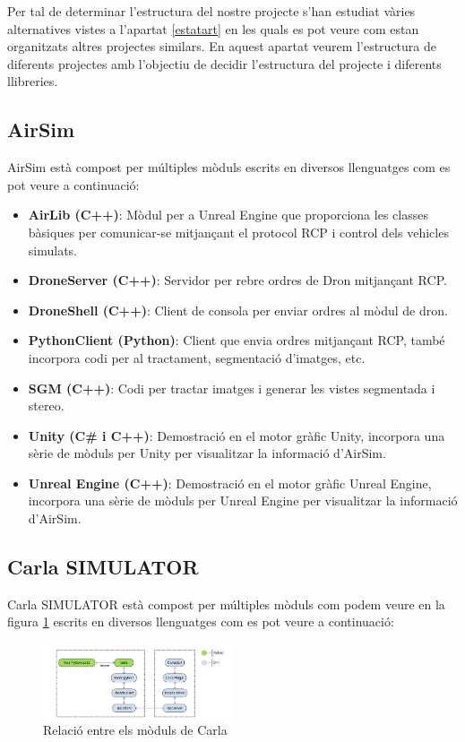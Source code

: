 \documentclass[10pt,a4paper,twocolumn,twoside]{article}
\begin{document}
Per tal de determinar l'estructura del nostre projecte s'han estudiat vàries alternatives vistes a l'apartat \ref{estatart} en les quals es pot veure com estan organitzats altres projectes similars. En aquest apartat veurem l'estructura de diferents projectes amb l'objectiu de decidir l'estructura del projecte i diferents llibreries.

\subsection{AirSim} 

AirSim està compost per múltiples mòduls escrits en diversos llenguatges com es pot veure a continuació:

\begin{itemize}
  \item \textbf{AirLib (C++)}: Mòdul per a Unreal Engine que proporciona les classes bàsiques per comunicar-se mitjançant el protocol RCP i control dels vehicles simulats.
  \item \textbf{DroneServer (C++)}: Servidor per rebre ordres de Dron mitjançant RCP.
  \item \textbf{DroneShell (C++)}: Client de consola per enviar ordres al mòdul de dron.
  \item \textbf{PythonClient (Python)}: Client que envia ordres mitjançant RCP, també incorpora codi per al tractament, segmentació d'imatges, etc.
  \item \textbf{SGM (C++)}: Codi per tractar imatges i generar les vistes segmentada i stereo.
  \item \textbf{Unity (C\# i C++)}: Demostració en el motor gràfic Unity, incorpora una sèrie de mòduls per Unity per visualitzar la informació d'AirSim.
  \item \textbf{Unreal Engine (C++)}: Demostració en el motor gràfic Unreal Engine, incorpora una sèrie de mòduls per Unreal Engine per visualitzar la informació d'AirSim.
\end{itemize}

\subsection{Carla SIMULATOR}

Carla SIMULATOR està compost per múltiples mòduls com podem veure en la figura \ref{fig-carlamodules} escrits en diversos llenguatges com es pot veure a continuació:

\begin{figure}[!h]
\centering
  	\includegraphics[width=0.5\textwidth]{carlamodules}
	\caption{Relació entre els mòduls de Carla}
	\label{fig-carlamodules}
\end{figure}
\end{document}
